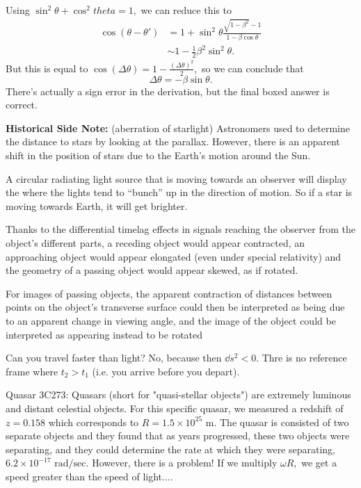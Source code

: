 \documentclass{article}
\numberwithin{equation}{section}
\begin{document}
Using $\sin^2\theta+\cos^2theta=1,$ we can reduce this to 
\begin{align}
    \cos(\theta-\theta') &= 1 + \sin^2\theta\frac{\sqrt{1-\beta^2}-1}{1-\beta\cos\theta} \\ 
    &\sim 1 - \frac{1}{2}\beta^2\sin^2\theta.
\end{align}
But this is equal to $\cos(\Delta \theta) = 1 - \frac{(\Delta \theta)^2}{2},$ so we can conclude that 
\begin{equation}
    \boxed{\Delta \theta = -\beta\sin\theta.}
\end{equation}
There's actually a sign error in the derivation, but the final boxed answer is correct.

\textbf{Historical Side Note:} (aberration of starlight) Astronomers used to determine the distance to stars by looking at the parallax. However, there is an apparent shift in the position of stars due to the Earth's motion around the Sun.
\vspace{2mm}

A circular radiating light source that is moving towards an observer will display the  where the lights tend to ``bunch'' up in the direction of motion. So if a star is moving towards Earth, it will get brighter.
 
 Thanks to the differential timelag effects in signals reaching the observer from the object's different parts, a receding object would appear contracted, an approaching object would appear elongated (even under special relativity) and the geometry of a passing object would appear skewed, as if rotated.
\vspace{2mm}

For images of passing objects, the apparent contraction of distances between points on the object's transverse surface could then be interpreted as being due to an apparent change in viewing angle, and the image of the object could be interpreted as appearing instead to be rotated
\vspace{2mm}

 Can you travel faster than light? No, because then $\dd{s}^2<0.$ Thre is no reference frame where $t_2>t_1$ (i.e. you arrive before you depart).
\vspace{2mm}

Quasar 3C273: Quasars (short for "quasi-stellar objects") are extremely luminous and distant celestial objects. For this specific quasar, we measured a redshift of $z=0.158$ which corresponds to $R=1.5\times 10^{25}\text{ m}.$ The quasar is consisted of two separate objects and they found that as years progressed, these two objects were separating, and they could determine the rate at which they were separating, $6.2\times 10^{-17}\text{ rad/sec}.$ However, there is a problem! If we multiply $\omega R,$ we get a speed greater than the speed of light....
\end{document}
